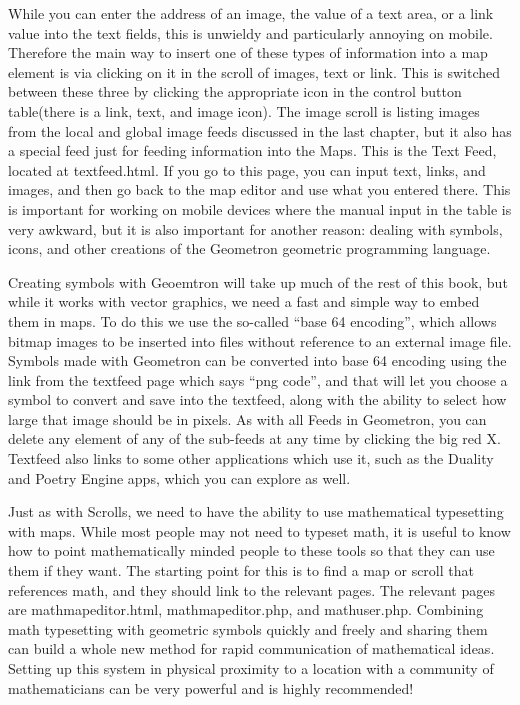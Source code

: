 While you can enter the address of an image, the value of a text area, or a link value into the text fields, this is unwieldy and particularly annoying on mobile.  Therefore the main way to insert one of these types of information into a map element is via clicking on it in the scroll of images, text or link.  This is switched between these three by clicking the appropriate icon in the control button table(there is a link, text, and image icon).   The image scroll is listing images from the local and global image feeds discussed in the last chapter, but it also has a special feed just for feeding information into the Maps.  This is the Text Feed, located at textfeed.html.  If you go to this page, you can input text, links, and images, and then go back to the map editor and use what you entered there.  This is important for working on mobile devices where the manual input in the table is very awkward, but it is also important for another reason: dealing with symbols, icons, and other creations of the Geometron geometric programming language.

Creating symbols with Geoemtron will take up much of the rest of this book, but while it works with vector graphics, we need a fast and simple way to embed them in maps.  To do this we use the so-called ``base 64 encoding'', which allows bitmap images to be inserted into files without reference to an external image file.   Symbols made with Geometron can be converted into base 64 encoding using the link from the textfeed page which says ``png code'', and that will let you choose a symbol to convert and save into the textfeed, along with the ability to select how large that image should be in pixels.  As with all Feeds in Geometron, you can delete any element of any of the sub-feeds at any time by clicking the big red X.  Textfeed also links to some other applications which use it, such as the Duality and Poetry Engine apps, which you can explore as well.

Just as with Scrolls, we need to have the ability to use mathematical typesetting with maps.  While most people may not need to typeset math, it is useful to know how to point mathematically minded people to these tools so that they can use them if they want.   The starting point for this is to find a map or scroll that references math, and they should link to the relevant pages.  The relevant pages are mathmapeditor.html, mathmapeditor.php, and mathuser.php.  Combining math typesetting with geometric symbols quickly and freely and sharing them can build a whole new method for rapid communication of mathematical ideas.  Setting up this system in physical proximity to a location with a community of mathematicians can be very powerful and is highly recommended!  

